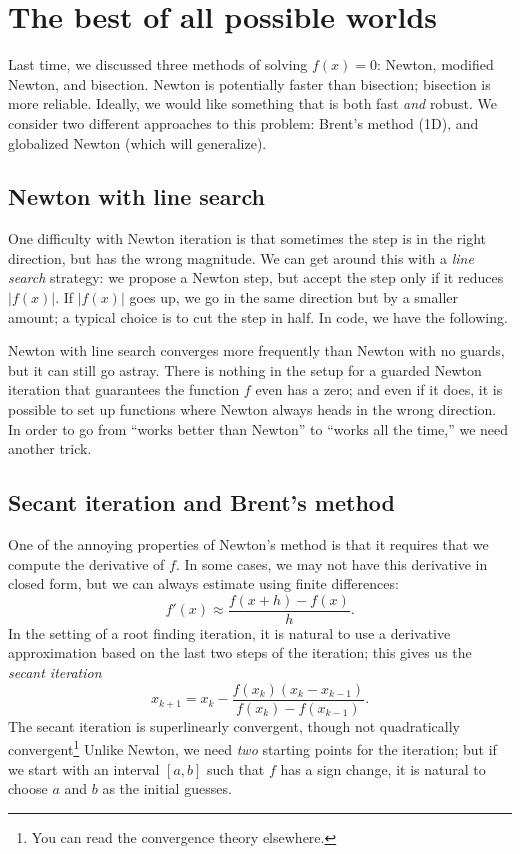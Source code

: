 \documentclass[12pt, leqno]{article} %
\begin{document}

\section{The best of all possible worlds}

Last time, we discussed three methods of solving $f(x) = 0$:
Newton, modified Newton, and bisection.  Newton is potentially faster
than bisection; bisection is more reliable.  Ideally, we would like
something that is both fast {\em and} robust.  We consider two
different approaches to this problem: Brent's method (1D), and
globalized Newton (which will generalize).

\subsection{Newton with line search}

One difficulty with Newton iteration is that sometimes the step is
in the right direction, but has the wrong magnitude.  We can get
around this with a {\em line search} strategy: we propose a Newton
step, but accept the step only if it reduces $|f(x)|$.  If $|f(x)|$
goes up, we go in the same direction but by a smaller amount;
a typical choice is to cut the step in half.  In code, we have the following.



Newton with line search converges more frequently than Newton with no
guards, but it can still go astray.  There is nothing in the setup for
a guarded Newton iteration that guarantees the function $f$ even has a
zero; and even if it does, it is possible to set up functions where
Newton always heads in the wrong direction.  In order to go from
``works better than Newton'' to ``works all the time,'' we need
another trick.

\subsection{Secant iteration and Brent's method}

One of the annoying properties of Newton's method is that it requires
that we compute the derivative of $f$.  In some cases, we may not have
this derivative in closed form, but we can always estimate using
finite differences:
\[
  f'(x) \approx \frac{f(x+h)-f(x)}{h}.
\]
In the setting of a root finding iteration, it is natural to use a
derivative approximation based on the last two steps of the iteration;
this gives us the {\em secant iteration}
\[
  x_{k+1} = x_k - \frac{f(x_k)(x_k-x_{k-1})}{f(x_{k})-f(x_{k-1})}.
\]
The secant iteration is superlinearly convergent, though not
quadratically convergent\footnote{You can read the convergence
  theory elsewhere.}
Unlike Newton, we need {\em two} starting points for the iteration;
but if we start with an interval $[a,b]$ such that $f$ has a sign
change, it is natural to choose $a$ and $b$ as the initial guesses.
\end{document}
